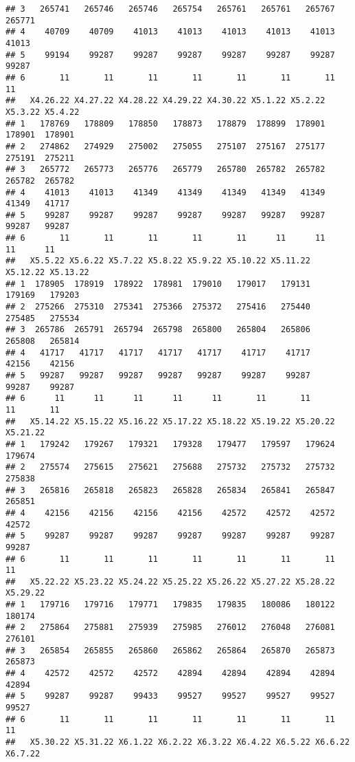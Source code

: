 \documentclass[
]{article}
\begin{document}
\begin{verbatim}
## 3   265741   265746   265746   265754   265761   265761   265767   265771
## 4    40709    40709    41013    41013    41013    41013    41013    41013
## 5    99194    99287    99287    99287    99287    99287    99287    99287
## 6       11       11       11       11       11       11       11       11
##   X4.26.22 X4.27.22 X4.28.22 X4.29.22 X4.30.22 X5.1.22 X5.2.22 X5.3.22 X5.4.22
## 1   178769   178809   178850   178873   178879  178899  178901  178901  178901
## 2   274862   274929   275002   275055   275107  275167  275177  275191  275211
## 3   265772   265773   265776   265779   265780  265782  265782  265782  265782
## 4    41013    41013    41349    41349    41349   41349   41349   41349   41717
## 5    99287    99287    99287    99287    99287   99287   99287   99287   99287
## 6       11       11       11       11       11      11      11      11      11
##   X5.5.22 X5.6.22 X5.7.22 X5.8.22 X5.9.22 X5.10.22 X5.11.22 X5.12.22 X5.13.22
## 1  178905  178919  178922  178981  179010   179017   179131   179169   179203
## 2  275266  275310  275341  275366  275372   275416   275440   275485   275534
## 3  265786  265791  265794  265798  265800   265804   265806   265808   265814
## 4   41717   41717   41717   41717   41717    41717    41717    42156    42156
## 5   99287   99287   99287   99287   99287    99287    99287    99287    99287
## 6      11      11      11      11      11       11       11       11       11
##   X5.14.22 X5.15.22 X5.16.22 X5.17.22 X5.18.22 X5.19.22 X5.20.22 X5.21.22
## 1   179242   179267   179321   179328   179477   179597   179624   179674
## 2   275574   275615   275621   275688   275732   275732   275732   275838
## 3   265816   265818   265823   265828   265834   265841   265847   265851
## 4    42156    42156    42156    42156    42572    42572    42572    42572
## 5    99287    99287    99287    99287    99287    99287    99287    99287
## 6       11       11       11       11       11       11       11       11
##   X5.22.22 X5.23.22 X5.24.22 X5.25.22 X5.26.22 X5.27.22 X5.28.22 X5.29.22
## 1   179716   179716   179771   179835   179835   180086   180122   180174
## 2   275864   275881   275939   275985   276012   276048   276081   276101
## 3   265854   265855   265860   265862   265864   265870   265873   265873
## 4    42572    42572    42572    42894    42894    42894    42894    42894
## 5    99287    99287    99433    99527    99527    99527    99527    99527
## 6       11       11       11       11       11       11       11       11
##   X5.30.22 X5.31.22 X6.1.22 X6.2.22 X6.3.22 X6.4.22 X6.5.22 X6.6.22 X6.7.22

\end{verbatim}
\end{document}
